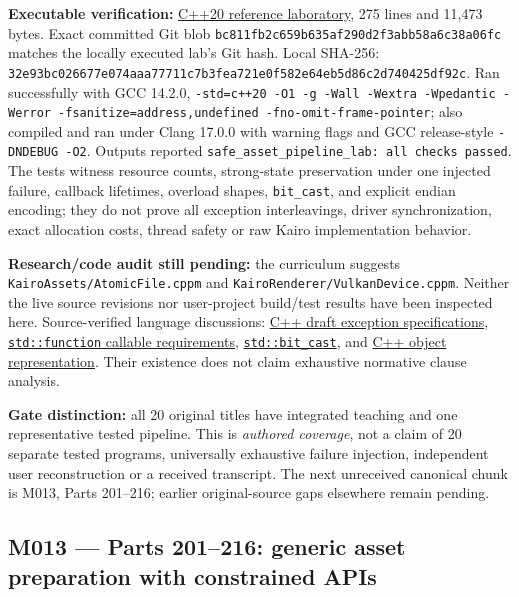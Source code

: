 \textbf{Executable verification:} \href{tools/labs/safe_asset_pipeline_lab.cpp}{C++20 reference laboratory}, 275 lines and 11,473 bytes. Exact committed Git blob \texttt{bc811fb2c659b635af290d2f3abb58a6c38a06fc} matches the locally executed lab's Git hash. Local SHA-256: \texttt{32e93bc026677e074aaa77711c7b3fea721e0f582e64eb5d86c2d740425df92c}. Ran successfully with GCC 14.2.0, \texttt{-std=c++20\ -O1\ -g\ -Wall\ -Wextra\ -Wpedantic\ -Werror\ -fsanitize=address,undefined\ -fno-omit-frame-pointer}; also compiled and ran under Clang 17.0.0 with warning flags and GCC release-style \texttt{-DNDEBUG\ -O2}. Outputs reported \texttt{safe\_asset\_pipeline\_lab:\ all\ checks\ passed}. The tests witness resource counts, strong-state preservation under one injected failure, callback lifetimes, overload shapes, \texttt{bit\_cast}, and explicit endian encoding; they do not prove all exception interleavings, driver synchronization, exact allocation costs, thread safety or raw Kairo implementation behavior.

\textbf{Research/code audit still pending:} the curriculum suggests \texttt{KairoAssets/AtomicFile.cppm} and \texttt{KairoRenderer/VulkanDevice.cppm}. Neither the live source revisions nor user-project build/test results have been inspected here. Source-verified language discussions: \href{https://eel.is/c++draft/except.spec}{C++ draft exception specifications}, \href{https://en.cppreference.com/w/cpp/utility/functional/function}{\texttt{std::function} callable requirements}, \href{https://en.cppreference.com/w/cpp/numeric/bit_cast}{\texttt{std::bit\_cast}}, and \href{https://en.cppreference.com/w/cpp/language/object}{C++ object representation}. Their existence does not claim exhaustive normative clause analysis.

\textbf{Gate distinction:} all 20 original titles have integrated teaching and one representative tested pipeline. This is \emph{authored coverage}, not a claim of 20 separate tested programs, universally exhaustive failure injection, independent user reconstruction or a received transcript. The next unreceived canonical chunk is M013, Parts 201--216; earlier original-source gaps elsewhere remain pending.

\subsection{M013 --- Parts 201--216: generic asset preparation with constrained APIs}\label{m013-parts-201216-generic-asset-preparation-with-constrained-apis}

